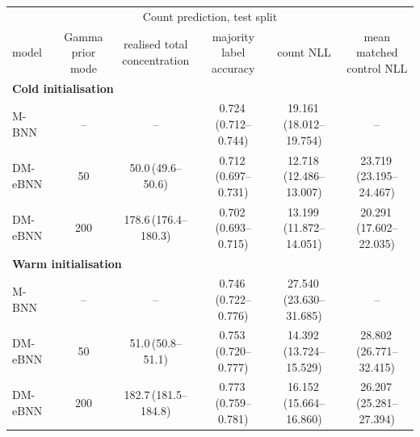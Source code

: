 \begin{tabular}{lccccc}
\toprule
\multicolumn{6}{c}{Count prediction, test split} \\
model & \shortstack{Gamma prior\\mode} & \shortstack{realised total\\concentration} & \shortstack{majority label\\accuracy} & count NLL & \shortstack{mean matched\\control NLL} \\
\midrule
\multicolumn{6}{l}{\textbf{Cold initialisation}} \\
\midrule
M-BNN & -- & -- & 0.724\,(0.712--0.744) & 19.161\,(18.012--19.754) & -- \\
DM-eBNN & 50 & 50.0\,(49.6--50.6) & 0.712\,(0.697--0.731) & 12.718\,(12.486--13.007) & 23.719\,(23.195--24.467) \\
DM-eBNN & 200 & 178.6\,(176.4--180.3) & 0.702\,(0.693--0.715) & 13.199\,(11.872--14.051) & 20.291\,(17.602--22.035) \\
\midrule
\multicolumn{6}{l}{\textbf{Warm initialisation}} \\
\midrule
M-BNN & -- & -- & 0.746\,(0.722--0.776) & 27.540\,(23.630--31.685) & -- \\
DM-eBNN & 50 & 51.0\,(50.8--51.1) & 0.753\,(0.720--0.777) & 14.392\,(13.724--15.529) & 28.802\,(26.771--32.415) \\
DM-eBNN & 200 & 182.7\,(181.5--184.8) & 0.773\,(0.759--0.781) & 16.152\,(15.664--16.860) & 26.207\,(25.281--27.394) \\
\bottomrule
\end{tabular}
